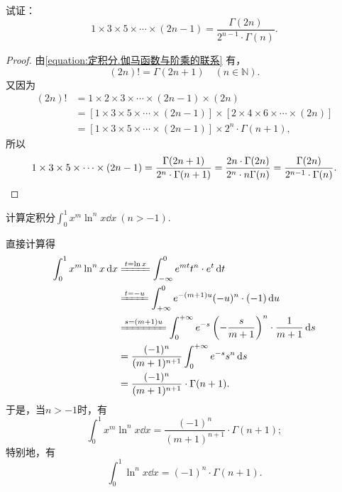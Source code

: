 \begin{example}
试证：\begin{equation}\label{equation:定积分.伽马函数与双阶乘的联系2}
1 \times 3 \times 5 \times\dotsm\times (2n-1) = \frac{\Gamma(2n)}{2^{n-1} \cdot \Gamma(n)}.
\end{equation}
\begin{proof}
由\cref{equation:定积分.伽马函数与阶乘的联系} 有，\[
(2n)! = \Gamma(2n+1) \quad(n\in\mathbb{N}).
\]又因为\[
\begin{split}
(2n)! &= 1 \times 2 \times 3 \times\dotsm\times (2n-1) \times (2n) \\
&= [1 \times 3 \times 5 \times\dotsm\times (2n-1)]
	\times [2 \times 4 \times 6 \times\dotsm\times (2n)] \\
&= [1 \times 3 \times 5 \times\dotsm\times (2n-1)] \times 2^n \cdot \Gamma(n+1),
\end{split}
\]所以\[
1 \times 3 \times 5 \times\dotsm\times (2n-1)
= \frac{\Gamma(2n+1)}{2^n \cdot \Gamma(n+1)} \\
= \frac{2n \cdot \Gamma(2n)}{2^n \cdot n\Gamma(n)}
= \frac{\Gamma(2n)}{2^{n-1} \cdot \Gamma(n)}.
\qedhere
\]
\end{proof}
\end{example}

\begin{example}
计算定积分\(\int_0^1 x^m \ln^n x \dd{x}\ (n>-1)\).
\begin{solution}
直接计算得
\begin{align*}
\int_0^1 x^m \ln^n x \dd{x}
&\xlongequal{t=\ln x}
\int_{-\infty}^0 e^{mt} t^n \cdot e^t \dd{t} \\
&\xlongequal{t=-u}
\int_{+\infty}^0 e^{-(m+1)u} (-u)^n \cdot (-1) \dd{u} \\
&\xlongequal{s=(m+1)u}
\int_0^{+\infty} e^{-s} \left(-\frac{s}{m+1}\right)^n \cdot \frac{1}{m+1} \dd{s} \\
&=
\frac{(-1)^n}{(m+1)^{n+1}} \int_0^{+\infty} e^{-s} s^n \dd{s} \\
&=
\frac{(-1)^n}{(m+1)^{n+1}} \cdot \Gamma(n+1).
\end{align*}
于是，当\(n>-1\)时，有\begin{equation}
\int_0^1 x^m \ln^n x \dd{x}
= \frac{(-1)^n}{(m+1)^{n+1}} \cdot \Gamma(n+1);
\end{equation}
特别地，有\begin{equation}
\int_0^1 \ln^n x \dd{x}
= (-1)^n \cdot \Gamma(n+1).
\end{equation}
\end{solution}
\end{example}

